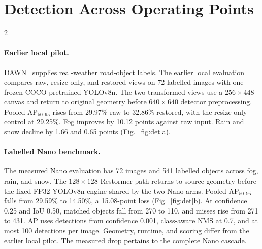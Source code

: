 \section{Detection Across Operating Points}
\label{sec:dawn}

\noindent\begin{minipage}{\linewidth}
\centering{}
\label{fig:det}
\end{minipage}
\medskip
\noindent\begin{minipage}{\linewidth}
\centering{}
\label{fig:resolution}
\end{minipage}
\begin{multicols}{2}\raggedcolumns
\paragraph{Earlier local pilot.}
DAWN~\cite{Kenk_2020_DAWN} supplies real-weather road-object labels. The earlier local evaluation compares raw, resize-only, and restored views on 72 labelled images with one frozen COCO-pretrained YOLOv8n. The two transformed views use a $256\times448$ canvas and return to original geometry before $640\times640$ detector preprocessing. Pooled AP$_{50:95}$ rises from 29.97\% raw to 32.86\% restored, with the resize-only control at 29.25\%. Fog improves by 10.12 points against raw input. Rain and snow decline by 1.66 and 0.65 points (Fig.~\ref{fig:det}a).

\paragraph{Labelled Nano benchmark.}
The measured Nano evaluation has 72 images and 541 labelled objects across fog, rain, and snow. The $128\times128$ Restormer path returns to source geometry before the fixed FP32 YOLOv8n engine shared by the two Nano arms. Pooled AP$_{50:95}$ falls from 29.59\% to 14.50\%, a 15.08-point loss (Fig.~\ref{fig:det}b). At confidence 0.25 and IoU 0.50, matched objects fall from 270 to 110, and misses rise from 271 to 431. AP uses detections from confidence 0.001, class-aware NMS at 0.7, and at most 100 detections per image. Geometry, runtime, and scoring differ from the earlier local pilot. The measured drop pertains to the complete Nano cascade.


\end{multicols}
